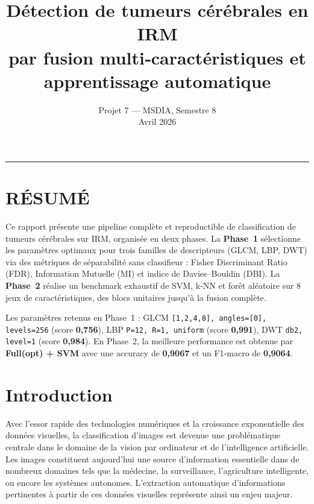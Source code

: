 \documentclass[12pt,a4paper]{article}
\newcommand{\brun}[1]{\textcolor{BlueNum}{\textbf{#1}}} %
\newcommand{\code}[1]{\texttt{#1}}
\begin{document}
    \title{Détection de tumeurs cérébrales en IRM \\[0.3cm]
    \large par fusion multi‑caractéristiques et apprentissage automatique}
    \author{Projet 7 — MSDIA, Semestre 8 \\ Avril 2026}
    \date{}
    \maketitle

    \begin{center}
    \rule{0.9\textwidth}{1pt}
    \end{center}

    \section*{RÉSUMÉ}
    Ce rapport présente une pipeline complète et reproductible de classification de tumeurs cérébrales sur IRM, organisée en deux phases. 
    La \textbf{Phase~1} sélectionne les paramètres optimaux pour trois familles de descripteurs (GLCM, LBP, DWT) via des métriques de séparabilité sans classifieur : 
    Fisher Discriminant Ratio (FDR), Information Mutuelle (MI) et indice de Davies–Bouldin (DBI). 
    La \textbf{Phase~2} réalise un benchmark exhaustif de SVM, k‑NN et forêt aléatoire sur 8 jeux de caractéristiques, des blocs unitaires jusqu’à la fusion complète.

    Les paramètres retenus en Phase~1 : GLCM \code{[1,2,4,8], angles=[0], levels=256} (score \brun{0,756}), 
    LBP \code{P=12, R=1, uniform} (score \brun{0,991}), 
    DWT \code{db2, level=1} (score \brun{0,984}). 
    En Phase~2, la meilleure performance est obtenue par \textbf{Full(opt) + SVM} avec une accuracy de \brun{0,9067} et un F1‑macro de \brun{0,9064}.

    \section{Introduction}
    Avec l’essor rapide des technologies numériques et la croissance exponentielle des données visuelles, la classification d’images est devenue une problématique centrale dans le domaine de la vision par ordinateur et de l’intelligence artificielle.
    Les images constituent aujourd’hui une source d’information essentielle dans de nombreux domaines tels que la médecine, la surveillance, l’agriculture intelligente, ou encore les systèmes autonomes.
    L’extraction automatique d’informations pertinentes à partir de ces données visuelles représente ainsi un enjeu majeur.
\end{document}
